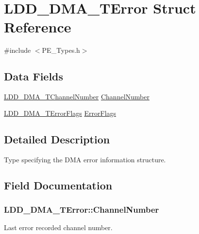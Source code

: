 \hypertarget{struct_l_d_d___d_m_a___t_error}{}\section{L\+D\+D\+\_\+\+D\+M\+A\+\_\+\+T\+Error Struct Reference}
\label{struct_l_d_d___d_m_a___t_error}


{\ttfamily \#include $<$P\+E\+\_\+\+Types.\+h$>$}

\subsection*{Data Fields}
\begin{DoxyCompactItemize}
\item 
\hyperlink{group___p_e___types__module_gad268d607015891269cb015faa8bc0dac}{L\+D\+D\+\_\+\+D\+M\+A\+\_\+\+T\+Channel\+Number} \hyperlink{struct_l_d_d___d_m_a___t_error_abc8d0c6909178bc7fe3957b7c01afd08}{Channel\+Number}
\item 
\hyperlink{group___p_e___types__module_gaea6d9250a094d0f060ae12a0b7abb474}{L\+D\+D\+\_\+\+D\+M\+A\+\_\+\+T\+Error\+Flags} \hyperlink{struct_l_d_d___d_m_a___t_error_a9dd0a645e1763b4daa0058b1b29c4ad7}{Error\+Flags}
\end{DoxyCompactItemize}


\subsection{Detailed Description}
Type specifying the D\+MA error information structure. 

\subsection{Field Documentation}
\subsubsection[{\texorpdfstring{Channel\+Number}{ChannelNumber}}]{ L\+D\+D\+\_\+\+D\+M\+A\+\_\+\+T\+Error\+::\+Channel\+Number}\hypertarget{struct_l_d_d___d_m_a___t_error_abc8d0c6909178bc7fe3957b7c01afd08}{}\label{struct_l_d_d___d_m_a___t_error_abc8d0c6909178bc7fe3957b7c01afd08}
Last error recorded channel number. 
